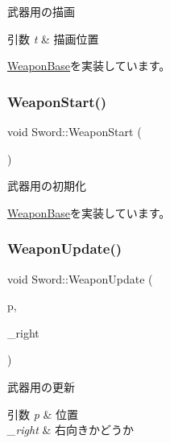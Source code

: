 武器用の描画 


\begin{DoxyParams}{引数}
{\em t} & 描画位置 \\
\hline
\end{DoxyParams}


\mbox{\hyperlink{class_weapon_base_a619809ea6c169446d9524f8089057436}{Weapon\+Base}}を実装しています。

\mbox{\label{class_sword_aa145196b7a7f01fd6fb6d4e323451b06}} 
\subsubsection{\texorpdfstring{Weapon\+Start()}{WeaponStart()}}
{\footnotesize\ttfamily void Sword\+::\+Weapon\+Start (\begin{DoxyParamCaption}{ }\end{DoxyParamCaption})\hspace{0.3cm}{\ttfamily [virtual]}}



武器用の初期化 



\mbox{\hyperlink{class_weapon_base_a25cd4c351638b76377e93341a9545712}{Weapon\+Base}}を実装しています。

\mbox{\label{class_sword_a11b6e50545688b52175a7089c61ac168}} 
\subsubsection{\texorpdfstring{Weapon\+Update()}{WeaponUpdate()}}
{\footnotesize\ttfamily void Sword\+::\+Weapon\+Update (\begin{DoxyParamCaption}\item[{const \mbox{\hyperlink{common_8h_afb0c5e21d4133ff4f200992c0b534e1b}{V\+E\+C2}} \&}]{p,  }\item[{bool}]{\+\_\+right }\end{DoxyParamCaption})\hspace{0.3cm}{\ttfamily [virtual]}}



武器用の更新 


\begin{DoxyParams}{引数}
{\em p} & 位置 \\
\hline
{\em \+\_\+right} & 右向きかどうか \\
\hline
\end{DoxyParams}


